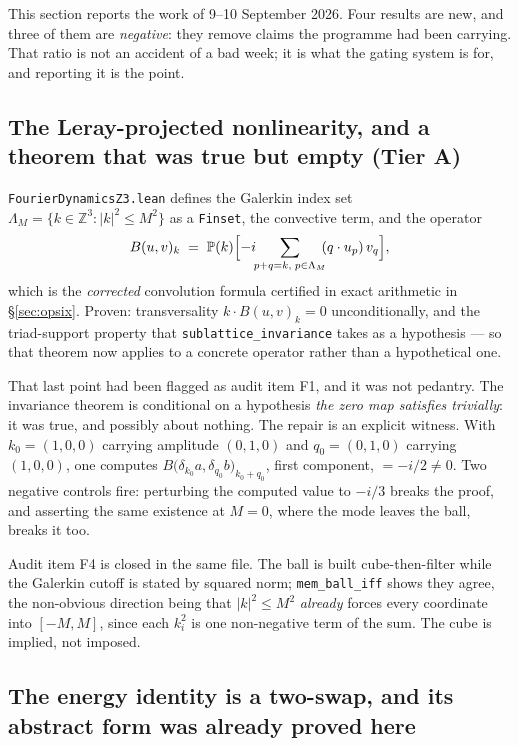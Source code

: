 \documentclass[11pt,a4paper]{article}
\newcommand{\tA}{\textcolor{TierA}{\textbf{Tier A}}}
\newcommand{\Z}{\mathbb{Z}}
\theoremstyle{definition}
\theoremstyle{plain}
\begin{document}
This section reports the work of 9--10 September 2026. Four results are new, and three of them
are \emph{negative}: they remove claims the programme had been carrying. That ratio is not an
accident of a bad week; it is what the gating system is for, and reporting it is the point.

\subsection{The Leray-projected nonlinearity, and a theorem that was true but empty (\tA{})}
\label{sec:opsixb}

\texttt{FourierDynamicsZ3.lean} defines the Galerkin index set $\Lambda_M=\{k\in\Z^3:|k|^2\le M^2\}$
as a \texttt{Finset}, the convective term, and the operator
\begin{equation}
  B(u,v)_k \;=\; \mathbb{P}(k)\Bigl[-i\!\!\sum_{p+q=k,\;p\in\Lambda_M}\!\!(q\cdot u_p)\,v_q\Bigr],
  \label{eq:Bop}
\end{equation}
which is the \emph{corrected} convolution formula certified in exact arithmetic in
\S\ref{sec:opsix}. Proven: transversality $k\cdot B(u,v)_k=0$ unconditionally, and the
triad-support property that \texttt{sublattice\_invariance} takes as a hypothesis --- so that
theorem now applies to a concrete operator rather than a hypothetical one.

That last point had been flagged as audit item F1, and it was not pedantry. The invariance theorem
is conditional on a hypothesis \emph{the zero map satisfies trivially}: it was true, and possibly
about nothing. The repair is an explicit witness. With $k_0=(1,0,0)$ carrying amplitude $(0,1,0)$
and $q_0=(0,1,0)$ carrying $(1,0,0)$, one computes
$B\bigl(\delta_{k_0}a,\delta_{q_0}b\bigr)_{k_0+q_0}$, first component, $=-i/2\neq0$. Two negative
controls fire: perturbing the computed value to $-i/3$ breaks the proof, and asserting the same
existence at $M=0$, where the mode leaves the ball, breaks it too.

Audit item F4 is closed in the same file. The ball is built cube-then-filter while the Galerkin
cutoff is stated by squared norm; \texttt{mem\_ball\_iff} shows they agree, the non-obvious
direction being that $|k|^2\le M^2$ \emph{already} forces every coordinate into $[-M,M]$, since
each $k_i^2$ is one non-negative term of the sum. The cube is implied, not imposed.

\subsection{The energy identity is a two-swap, and its abstract form was already proved here}
\label{sec:twoswap}
\end{document}
